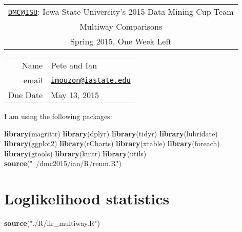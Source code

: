 \documentclass[10pt]{report}
\newenvironment{Shaded}{}{}
\newcommand{\KeywordTok}[1]{\textcolor[rgb]{0.00,0.44,0.13}{\textbf{{#1}}}}
\newcommand{\StringTok}[1]{\textcolor[rgb]{0.25,0.44,0.63}{{#1}}}
\newcommand{\NormalTok}[1]{{#1}}
\begin{document}
\thispagestyle{empty}%
\begin{center}%
    \renewcommand{\arraystretch}{1.5}%
    \begin{tabular}{c}%
       \Large{\href{mailto:DMC@ISU}{\nolinkurl{DMC@ISU}}: Iowa State University's 2015 Data Mining Cup Team}\\
       Multiway Comparisons\\
       Spring 2015, One Week Left \\
    \end{tabular}
\end{center}

\begin{center}
 \renewcommand{\arraystretch}{1.5}
 \begin{tabular*}{0.65\textwidth}{r@{:\hspace{.3cm}}l}
    \hline
     Name& Pete and Ian\\
     email& \href{mailto:imouzon@iastate.edu}{\nolinkurl{imouzon@iastate.edu}}\\
    
    
     Due Date&  May 13, 2015\\
    \hline
 \end{tabular*}
\end{center}

I am using the following packages:

\begin{Shaded}
\begin{Highlighting}[]
   \KeywordTok{library}\NormalTok{(magrittr)}
   \KeywordTok{library}\NormalTok{(dplyr)}
   \KeywordTok{library}\NormalTok{(tidyr)}
   \KeywordTok{library}\NormalTok{(lubridate)}
   \KeywordTok{library}\NormalTok{(ggplot2)}
   \KeywordTok{library}\NormalTok{(rCharts)}
   \KeywordTok{library}\NormalTok{(xtable)}
   \KeywordTok{library}\NormalTok{(foreach)}
   \KeywordTok{library}\NormalTok{(gtools)}
   \KeywordTok{library}\NormalTok{(knitr)}
   \KeywordTok{library}\NormalTok{(utils)}
   \KeywordTok{source}\NormalTok{(}\StringTok{"~/dmc2015/ian/R/renm.R"}\NormalTok{)}
\end{Highlighting}
\end{Shaded}

\section{Loglikelihood statistics}\label{loglikelihood-statistics}

\begin{Shaded}
\begin{Highlighting}[]
\KeywordTok{source}\NormalTok{(}\StringTok{"./R/llr_multiway.R"}\NormalTok{)}
\end{Highlighting}
\end{Shaded}
\end{document}
